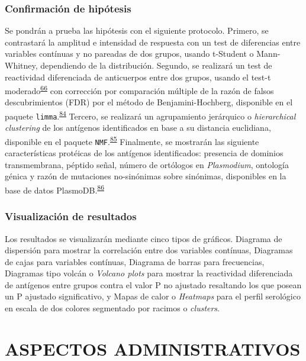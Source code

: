 \documentclass[]{article}
\begin{document}
\subsubsection{Confirmación de
hipótesis}\label{confirmacion-de-hipotesis}

Se pondrán a prueba las hipótesis con el siguiente protocolo. Primero,
se contrastará la amplitud e intensidad de respuesta con un test de
diferencias entre variables contínuas y no pareadas de dos grupos,
usando t-Student o Mann-Whitney, dependiendo de la distribución.
Segundo, se realizará un test de reactividad diferenciada de anticuerpos
entre dos grupos, usando el test-t
moderado\textsuperscript{\protect\hyperlink{ref-smyth2004ebayes}{66}}
con corrección por comparación múltiple de la razón de falsos
descubrimientos (FDR) por el método de Benjamini-Hochberg, disponible en
el paquete
\texttt{limma}.\textsuperscript{\protect\hyperlink{ref-limma}{84}}
Tercero, se realizará un agrupamiento jerárquico o \emph{hierarchical
clustering} de los antígenos identificados en base a su distancia
euclidiana, disponible en el paquete
\texttt{NMF}.\textsuperscript{\protect\hyperlink{ref-Gaujoux2010NMF}{85}}
Finalmente, se mostrarán las siguiente características protéicas de los
antígenos identificados: presencia de dominios transmembrana, péptido
señal, número de ortólogos en \emph{Plasmodium}, ontología génica y
razón de mutaciones no-sinónimas sobre sinónimas, disponibles en la base
de datos PlasmoDB.\textsuperscript{\protect\hyperlink{ref-plasmodb}{86}}

\subsubsection{Visualización de
resultados}\label{visualizacion-de-resultados}

Los resultados se visualizarán mediante cinco tipos de gráficos.
Diagrama de dispersión para mostrar la correlación entre dos variables
contínuas, Diagramas de cajas para variables contínuas, Diagrama de
barras para frecuencias, Diagramas tipo volcán o \emph{Volcano plots}
para mostrar la reactividad diferenciada de antígenos entre grupos
contra el valor P no ajustado resaltando los que posean un P ajustado
significativo, y Mapas de calor o \emph{Heatmaps} para el perfil
serológico en escala de dos colores segmentado por racimos o
\emph{clusters}.

\section{ASPECTOS ADMINISTRATIVOS}\label{aspectos-administrativos}
\end{document}
